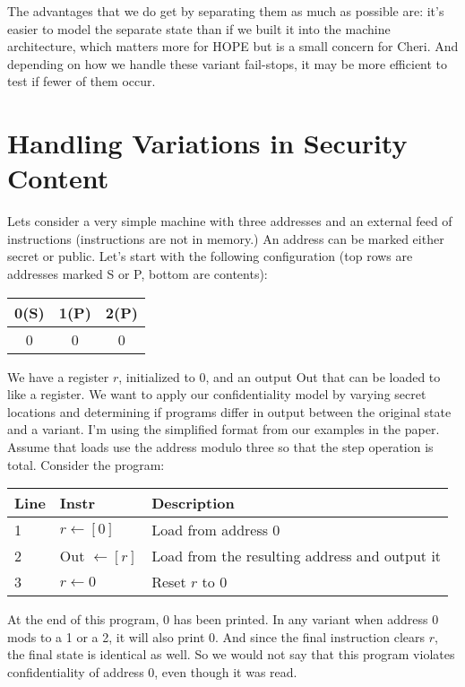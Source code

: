 \documentclass{article}
\begin{document}
The advantages that we do get by separating them as much as possible are: it's easier to model
the separate state than if we built it into the machine architecture, which matters more for
HOPE but is a small concern for Cheri. And depending on how we handle these variant fail-stops,
it may be more efficient to test if fewer of them occur.

\section{Handling Variations in Security Content}

Lets consider a very simple machine with three addresses and an external feed of instructions
(instructions are not in memory.) An address can be marked either secret or public. Let's start with
the following configuration (top rows are addresses marked S or P, bottom are contents):

\begin{tabular}{| c | c | c |}
  \hline
  0(S) & 1(P) & 2(P) \\
  \hline
  0 & 0 & 0 \\
  \hline
\end{tabular}

We have a register \(r\), initialized to 0, and an output {\sc Out} that can be loaded to like a register.
We want to apply our confidentiality model by varying secret locations and determining if programs
differ in output between the original state and a variant. I'm using the simplified format from our
examples in the paper. Assume that loads use the address modulo three so that the step operation is
total. Consider the program:

\vspace{\abovedisplayskip}

\begin{tabular}{l l l}
  Line & Instr & Description \\
  \hline
  1 & \(r \leftarrow [0]\) & Load from address 0 \\
  2 & {\sc Out} \(\leftarrow [r]\) & Load from the resulting address and output it \\
  3 & \(r \leftarrow 0\) & Reset \(r\) to 0 \\
\end{tabular}

\vspace{\belowdisplayskip}

At the end of this program, 0 has been printed. In any variant when address 0 mods to a 1 or a 2, it
will also print 0. And since the final instruction clears \(r\), the final state is identical as well.
So we would not say that this program violates confidentiality of address 0, even though it was read.
\end{document}
